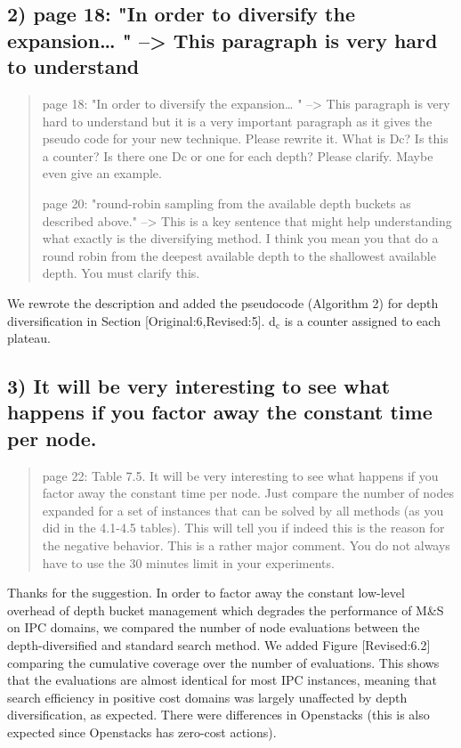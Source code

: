 \documentclass{article}
\begin{document}
\subsection{2) page 18: "In order to diversify the expansion\ldots{} " --> This paragraph is very hard to understand}
\label{sec:orgheadline2}

\begin{quote}
page 18: "In order to diversify the expansion\ldots{} " --> This
paragraph is very hard to understand but it is a very important
paragraph as it gives the pseudo code for your new technique. Please
rewrite it. What is Dc? Is this a counter? Is there one Dc or one for
each depth? Please clarify. Maybe even give an example.

page 20: "round-robin sampling from the available depth buckets as
described above." --> This is a key sentence that might help
understanding what exactly is the diversifying method. I think you
mean you that do a round robin from the deepest available depth to the
shallowest available depth. You must clarify this.
\end{quote}

We rewrote the description and added the pseudocode (Algorithm 2) for depth diversification
in Section [Original:6,Revised:5].
d\(_{\text{c}}\) is a counter assigned to each plateau.

\subsection{3) It will be very interesting to see what happens if you factor away the constant time per node.}
\label{sec:orgheadline3}

\begin{quote}
page 22: Table 7.5. It will be very interesting to see what
happens if you factor away the constant time per node. Just compare
the number of nodes expanded for a set of instances that can be solved
by all methods (as you did in the 4.1-4.5 tables). This will tell you
if indeed this is the reason for the negative behavior. This is a
rather major comment. You do not always have to use the 30 minutes
limit in your experiments.
\end{quote}

Thanks for the suggestion. In order to factor away the constant low-level overhead of depth bucket management
which degrades the performance of M\&S on IPC domains,
we compared the number of node evaluations between the depth-diversified and standard search method.
We added Figure [Revised:6.2] comparing the cumulative coverage over the number of evaluations.
This shows that the evaluations are almost identical for most IPC instances, meaning that search efficiency in positive cost domains was largely unaffected by depth diversification, as expected.
There were differences in Openstacks (this is also expected since Openstacks has zero-cost actions).
\end{document}
